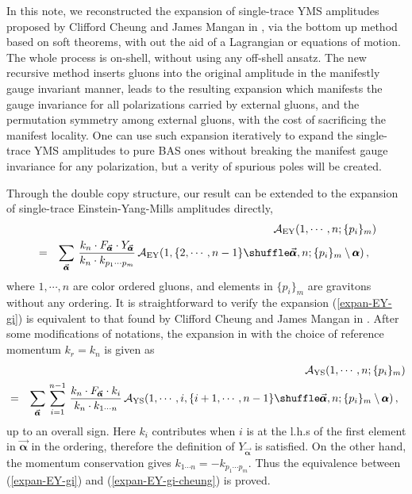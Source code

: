 \documentclass[preprint,showpacs,onecolumn,nofootinbib]{revtex4}
\newcommand{\bea}{\begin{eqnarray}}
\newcommand{\eea}{\end{eqnarray}}
\newcommand{\nn}{\nonumber \\}
\def\eref#1{(\ref{#1})}
\def\a{{\alpha}}
\begin{document}
In this note, we reconstructed the expansion of single-trace YMS amplitudes proposed by Clifford Cheung and James Mangan in \cite{Cheung:2021zvb}, via the bottom up method based on soft theorems, with out the aid of a Lagrangian or equations of motion. The whole process is on-shell, without using any off-shell ansatz. The new recursive method inserts gluons into the original amplitude in the manifestly gauge invariant manner, leads to the resulting expansion which manifests the gauge invariance for all polarizations carried by external gluons, and the permutation symmetry among external gluons, with the cost of sacrificing the manifest locality. One can use such expansion iteratively to expand the single-trace YMS amplitudes to pure BAS ones without breaking the manifest gauge invariance for any polarization, but a verity of spurious poles will be created.

Through the double copy structure, our result can be extended to the expansion of single-trace Einstein-Yang-Mills amplitudes directly,
%
\bea
& &{\cal A}_{\rm EY}(1,\cdots,n;\{p_i\}_m)\nn
&=&\sum_{\vec{\pmb{\a}}}\,{k_n\cdot F_{\vec{\pmb{\a}}}\cdot Y_{\vec{\pmb{\a}}}\over k_n\cdot k_{p_1\cdots p_m}}\,{\cal A}_{\rm EY}(1,\{2,\cdots,n-1\}\shuffle\vec{\pmb{\a}},n;\{p_i\}_m\setminus{\pmb{\a}})\,,~~\label{expan-EY-gi}
\eea
%
where $1,\cdots,n$ are color ordered gluons, and elements in $\{p_i\}_m$ are gravitons without any ordering. It is straightforward to verify
the expansion \eref{expan-EY-gi} is equivalent to that found by Clifford Cheung and James Mangan in \cite{Cheung:2021zvb}. After some modifications of notations, the expansion in \cite{Cheung:2021zvb} with the choice of reference momentum $k_r=k_n$ is given as
\bea
& &{\cal A}_{\rm YS}(1,\cdots,n;\{p_i\}_m)\nn
&=&\sum_{\vec{\pmb{\a}}}\,\sum_{i=1}^{n-1}\,{k_n\cdot F_{\vec{\pmb{\a}}}\cdot k_i\over k_n\cdot k_{1\cdots n}}\,{\cal A}_{\rm YS}(1,\cdots,i,\{i+1,\cdots,n-1\}\shuffle\vec{\pmb{\a}},n;\{p_i\}_m\setminus{\pmb{\a}})\,,~~\label{expan-EY-gi-cheung}
\eea
up to an overall sign.
Here $k_i$ contributes when $i$ is at the l.h.s of the first element in $\vec{\pmb{\a}}$ in the ordering, therefore the definition of $Y_{\vec{\pmb{\a}}}$ is satisfied. On the other hand, the momentum conservation gives $k_{1\cdots n}=-k_{p_1\cdots p_m}$. Thus the equivalence between \eref{expan-EY-gi} and \eref{expan-EY-gi-cheung} is proved.
\end{document}
